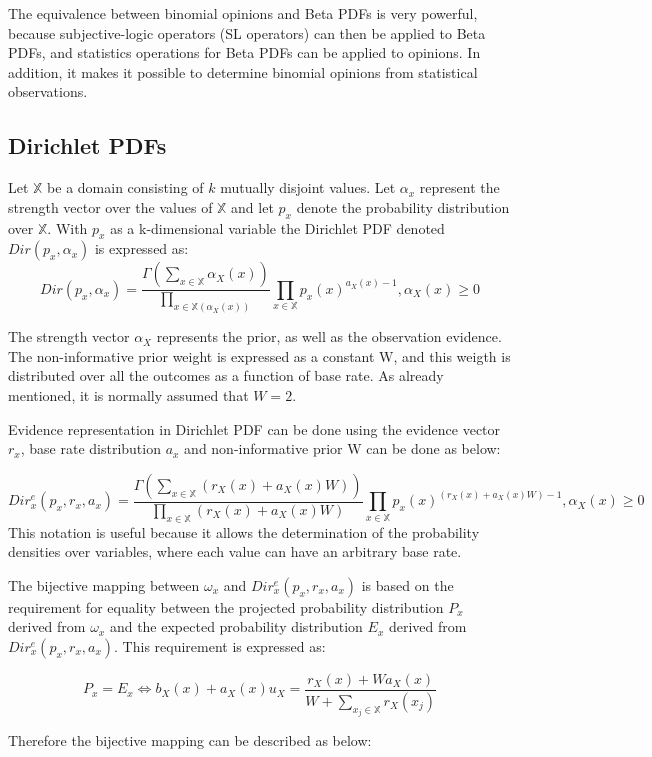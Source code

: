\documentclass[UTF8]{article}
\begin{document}
The equivalence between binomial opinions and Beta PDFs is very powerful,
because subjective-logic operators (SL operators) can then be applied to Beta PDFs,
and statistics operations for Beta PDFs can be applied to opinions. In addition, it
makes it possible to determine binomial opinions from statistical observations.

\subsection{Dirichlet PDFs}
Let $\mathbb{X}$ be a domain consisting of $k$ mutually disjoint values. Let $\alpha_x$ represent the strength vector over the values of $\mathbb{X}$ and let $p_x$ denote the probability distribution over $\mathbb{X}$. With $p_x$ as a k-dimensional variable the Dirichlet PDF denoted $Dir(p_x, \alpha_x)$ is expressed as:
$$
Dir(p_x, \alpha_x) = \frac{\Gamma\left(\sum_{x \in \mathbb{X}} \alpha_X(x)\right)}{\prod_{x \in \mathbb{X}(\alpha_X(x))}}\prod_{x \in \mathbb{X}}p_x(x)^{a_X(x) - 1},   \alpha_X(x) \geq 0
$$

The strength vector $\alpha_X$ represents the prior, as well as the observation evidence. The non-informative prior weight is expressed as a constant W, and this weigth is distributed over all the outcomes as a function of base rate. As already mentioned, it is normally assumed that $W = 2$.

Evidence representation in Dirichlet PDF can be done using the evidence vector $r_x$, base rate distribution $a_x$ and non-informative prior W can be done as below:

$$
Dir^e_x(p_x, r_x, a_x) = \frac{\Gamma\left(\sum_{x \in \mathbb{X}} (r_X(x) + a_X(x)W)\right)}{\prod_{x \in \mathbb{X}}(r_X(x) + a_X(x)W)}\prod_{x \in \mathbb{X}}p_x(x)^{(r_X(x) + a_X(x)W) - 1},   \alpha_X(x) \geq 0
$$
This notation is useful because it allows the determination of the probability densities over variables, where each value can have an arbitrary base rate.

The bijective mapping between $\omega_x$ and $Dir^e_x(p_x, r_x, a_x)$ is based on the requirement for equality between the projected probability distribution $P_x$ derived from $\omega_x$ and the expected probability distribution $E_x$ derived from $Dir^e_x(p_x, r_x, a_x)$. This requirement is expressed as:

$$
P_x = E_x
\Leftrightarrow
b_X(x) + a_X(x)u_X = \frac{r_X(x) + Wa_X(x)}{W + \sum_{x_j \in \mathbb{X}} r_X(x_j)}
$$

Therefore the bijective mapping can be described as below:
\end{document}
